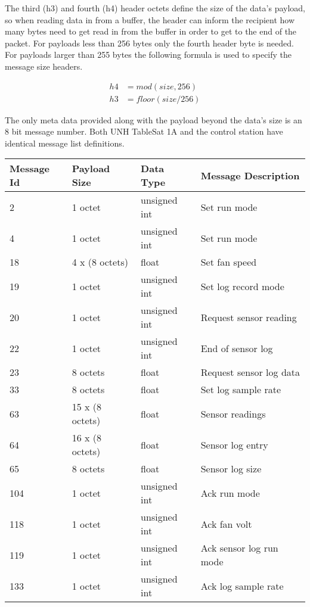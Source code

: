 The third (h3) and fourth (h4) header octets define the size of the data's payload, so when reading
data in from a buffer, the header can inform the recipient how many bytes need
to get read in from the buffer in order to get to the end of the packet.  For
payloads less than 256 bytes only the fourth header byte is needed.  For
payloads larger than 255 bytes the following formula is used to specify the
message size headers.

\begin{align}
h4 &= mod(size, 256) \\
h3 &= floor(size / 256)
\end{align}

The only meta data provided along with the payload beyond the data's size is
an 8 bit message number.  Both UNH TableSat 1A and the control station have
identical message list definitions.

\begin{center}
    \begin{tabular}{| l | l | l | l |}
    \hline
    Message Id & Payload Size & Data Type & Message Description \\ \hline
    2 & 1 octet & unsigned int & Set run mode \\ \hline
    4 & 1 octet & unsigned int & Set run mode \\ \hline
    18 & 4 x (8 octets) & float & Set fan speed \\ \hline
    19 & 1 octet & unsigned int & Set log record mode \\ \hline
    20 & 1 octet & unsigned int & Request sensor reading \\ \hline
    22 & 1 octet & unsigned int & End of sensor log \\ \hline
    23 & 8 octets & float & Request sensor log data \\ \hline
    33 & 8 octets & float & Set log sample rate \\ \hline
    63 & 15 x (8 octets) & float & Sensor readings \\ \hline
    64 & 16 x (8 octets) & float & Sensor log entry \\ \hline
    65 & 8 octets & float & Sensor log size \\ \hline
    104 & 1 octet & unsigned int & Ack run mode \\ \hline
    118 & 1 octet & unsigned int & Ack fan volt \\ \hline
    119 & 1 octet & unsigned int & Ack sensor log run mode \\ \hline
    133 & 1 octet & unsigned int & Ack log sample rate \\ \hline
    \end{tabular}
\end{center}

